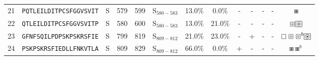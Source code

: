 \begin{tabular}{rcccccccccccc}
21 &  \texttt{PQTLEILDITPCSFGGVSVIT} &       S &    579 &   599 &  S$_{580-583}$ &                          13.0\% &                            0.0\% &          - &           - &          - &           - &                                                                                                                        $ \boxast $ \\
22 &  \texttt{QTLEILDITPCSFGGVSVITP} &       S &    580 &   600 &  S$_{580-583}$ &                          13.0\% &                           21.0\% &          - &           - &          - &           - &                                                                     $ \boxcircle \setlength{\fboxsep}{0.5pt} \boxed{\circledast} $ \\
23 &  \texttt{GFNFSQILPDPSKPSKRSFIE} &       S &    799 &   819 &  S$_{809-812}$ &                          21.0\% &                           23.0\% &          - &           + &          - &           - &                                              $ \boxempty \boxcircle \boxcircle^b \setlength{\fboxsep}{0.5pt} \boxed{\circledast} $ \\
24 &  \texttt{PSKPSKRSFIEDLLFNKVTLA} &       S &    809 &   829 &  S$_{809-812}$ &                          66.0\% &                            0.0\% &          + &           - &          - &           - &                                                                                                              $ \boxast \boxast^b $ \\
\bottomrule
\end{tabular}
